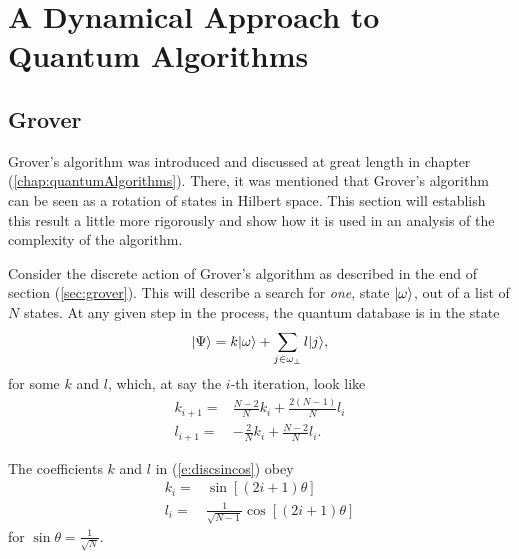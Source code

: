 
\chapter{A Dynamical Approach to Quantum Algorithms}
\label{chap:dynamics}
%

\section{Grover}

\label{sec:sincos}

Grover's algorithm was introduced and discussed at great length in
chapter (\ref{chap:quantumAlgorithms}).  There, it was mentioned that
Grover's algorithm can be seen as a rotation of states in Hilbert
space.  This section will establish this result a little more rigorously 
and show how it is used in an analysis of the complexity of the algorithm.

Consider the discrete action of Grover's algorithm as described in the end of
section (\ref{sec:grover}).  This will describe a search for \emph{one},
state ${|{\omega}\rangle}$,
out of a list of $N$ states.  At any given step in the process, the
quantum database is in the state
\begin{equation}
{|{\Psi}\rangle} = k{|{\omega}\rangle} + \sum_{j\in\omega_\perp}l{|{j}\rangle},
\end{equation}
for some $k$ and $l$, which, at say the $i$-th iteration, 
look like
\begin{equation}
\begin{split}
k_{i+1} =& \frac{N-2}{N}k_i + \frac{2(N-1)}{N}l_i\\
l_{i+1} =& -\frac{2}{N}k_i + \frac{N-2}{N}l_i.
\end{split}
\label{e:discsincos}
\end{equation}

\begin{prop}
\label{prop:sincos}
The coefficients $k$ and $l$ in (\ref{e:discsincos}) obey
\begin{equation}
\begin{split}
k_i =& \sin\left[\left(2i+1\right)\theta\right]\\
l_i =& \frac{1}{\sqrt{N-1}}\cos\left[\left(2i+1\right)\theta\right]
\end{split}
\label{e:sincos}
\end{equation}
for $\sin\theta = \frac{1}{\sqrt{N}}$.
\end{prop}

